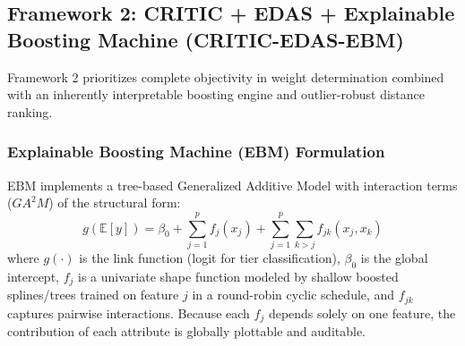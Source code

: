 \documentclass[twocolumn,10pt]{article}
\begin{document}
\subsection{Framework 2: CRITIC + EDAS + Explainable Boosting Machine (CRITIC-EDAS-EBM)}
\label{subsec:critic_edas_ebm}

Framework 2 prioritizes complete objectivity in weight determination combined with an inherently interpretable boosting engine and outlier-robust distance ranking.

\subsubsection{Explainable Boosting Machine (EBM) Formulation}
EBM implements a tree-based Generalized Additive Model with interaction terms ($GA^2M$) of the structural form:
\begin{equation}
    g(\mathbb{E}[y]) = \beta_0 + \sum_{j=1}^p f_j(x_j) + \sum_{j=1}^p \sum_{k > j} f_{jk}(x_j, x_k)
    \label{eq:ebm}
\end{equation}
where $g(\cdot)$ is the link function (logit for tier classification), $\beta_0$ is the global intercept, $f_j$ is a univariate shape function modeled by shallow boosted splines/trees trained on feature $j$ in a round-robin cyclic schedule, and $f_{jk}$ captures pairwise interactions. Because each $f_j$ depends solely on one feature, the contribution of each attribute is globally plottable and auditable.
\end{document}
